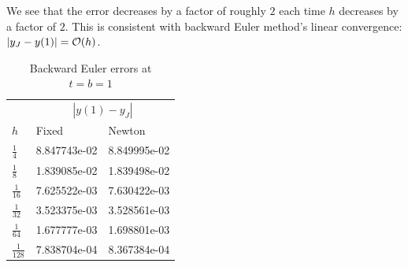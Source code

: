 \documentclass{homework}
\begin{document}
\begin{alphaparts}
		We see that the error decreases by a factor of roughly $2$ each time $h$ decreases by a factor of $2$. This is consistent with backward Euler method's linear convergence: $|y_J - y(1)| = \mathcal{O}(h)$.
		\begin{table}[H]
			\centering
			\begin{tabular}{@{}lll@{}}
				\toprule
				& \multicolumn{2}{c}{$|y(1) - y_J|$} \\
				\cmidrule{2-3}
				$h$ & Fixed & Newton \\
				\midrule
				$\frac{1}{4}$ & 8.847743e-02 & 8.849995e-02 \\[0.4em]
				$\frac{1}{8}$ & 1.839085e-02 & 1.839498e-02 \\[0.4em]
				$\frac{1}{16}$ & 7.625522e-03 & 7.630422e-03 \\[0.4em]
				$\frac{1}{32}$ & 3.523375e-03 & 3.528561e-03 \\[0.4em]
				$\frac{1}{64}$ & 1.677777e-03 & 1.698801e-03 \\[0.4em]
				$\frac{1}{128}$ & 7.838704e-04 & 8.367384e-04\\[0.4em]
				\bottomrule
			\end{tabular}
			\caption{Backward Euler errors at $t = b = 1$}
			\label{table:p8:c}
		\end{table}
		

\end{alphaparts}
\end{document}
